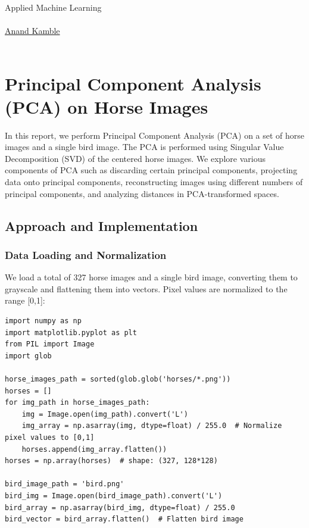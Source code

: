 \documentclass{article}
\begin{document}
\begin{center}
{\textcolor{RedOrange}{Applied Machine Learning}} \\
\vspace{0.5em}
 \\
\vspace{1em}
\href{mailto:amk23j@fsu.edu}{Anand Kamble}\\
 \\
\end{center}
\noindent\hrulefill

\section*{Principal Component Analysis (PCA) on Horse Images}

In this report, we perform Principal Component Analysis (PCA) on a set of horse images and a single bird image. The PCA is performed using Singular Value Decomposition (SVD) of the centered horse images. We explore various components of PCA such as discarding certain principal components, projecting data onto principal components, reconstructing images using different numbers of principal components, and analyzing distances in PCA-transformed spaces.

\subsection*{Approach and Implementation}

\subsubsection*{Data Loading and Normalization}

We load a total of 327 horse images and a single bird image, converting them to grayscale and flattening them into vectors. Pixel values are normalized to the range [0,1]:

\begin{verbatim}
import numpy as np
import matplotlib.pyplot as plt
from PIL import Image
import glob

horse_images_path = sorted(glob.glob('horses/*.png'))
horses = []
for img_path in horse_images_path:
    img = Image.open(img_path).convert('L')
    img_array = np.asarray(img, dtype=float) / 255.0  # Normalize pixel values to [0,1]
    horses.append(img_array.flatten())
horses = np.array(horses)  # shape: (327, 128*128)

bird_image_path = 'bird.png'
bird_img = Image.open(bird_image_path).convert('L')
bird_array = np.asarray(bird_img, dtype=float) / 255.0
bird_vector = bird_array.flatten()  # Flatten bird image
\end{verbatim}
\end{document}

